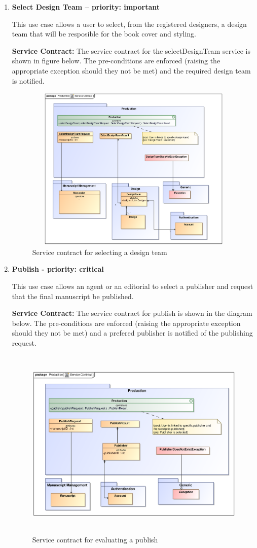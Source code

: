 \begin{enumerate}
\newpage
\item \textbf{Select Design Team – priority: important}\\
\par{This use case allows a user to select, from the registered designers, a design team that will be resposible for the book cover and styling.}

\textbf{Service Contract:} 
The service contract for the selectDesignTeam service is shown in figure below. The pre-conditions are enforced (raising the appropriate exception should they not be met) and the required design team is notified.

\begin{figure}[h]
\includegraphics[height=300px, width=500px]{epsImages/Production/SelectDesignTeam.eps}
\caption{Service contract for selecting a design team}
\end{figure}


\newpage
\item \textbf{Publish - priority: critical}
\par{This use case allows an agent or an editorial to select a publisher and request that the final manuscript be published.}

\textbf{Service Contract:} 
The service contract for publish is shown in the diagram below. The pre-conditions are enforced (raising the appropriate exception should they not be met) and a prefered publisher is notified of the publishing request.

\begin{figure}[h]
\includegraphics[height=350px, width=500px]{epsImages/Production/Publish.eps}
\caption{Service contract for evaluating a publish}
\end{figure}
\end{enumerate}